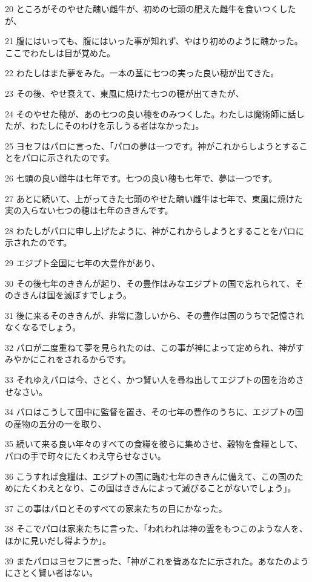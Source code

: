 \par 20 ところがそのやせた醜い雌牛が、初めの七頭の肥えた雌牛を食いつくしたが、
\par 21 腹にはいっても、腹にはいった事が知れず、やはり初めのように醜かった。ここでわたしは目が覚めた。
\par 22 わたしはまた夢をみた。一本の茎に七つの実った良い穂が出てきた。
\par 23 その後、やせ衰えて、東風に焼けた七つの穂が出てきたが、
\par 24 そのやせた穂が、あの七つの良い穂をのみつくした。わたしは魔術師に話したが、わたしにそのわけを示しうる者はなかった」。
\par 25 ヨセフはパロに言った、「パロの夢は一つです。神がこれからしようとすることをパロに示されたのです。
\par 26 七頭の良い雌牛は七年です。七つの良い穂も七年で、夢は一つです。
\par 27 あとに続いて、上がってきた七頭のやせた醜い雌牛は七年で、東風に焼けた実の入らない七つの穂は七年のききんです。
\par 28 わたしがパロに申し上げたように、神がこれからしようとすることをパロに示されたのです。
\par 29 エジプト全国に七年の大豊作があり、
\par 30 その後七年のききんが起り、その豊作はみなエジプトの国で忘れられて、そのききんは国を滅ぼすでしょう。
\par 31 後に来るそのききんが、非常に激しいから、その豊作は国のうちで記憶されなくなるでしょう。
\par 32 パロが二度重ねて夢を見られたのは、この事が神によって定められ、神がすみやかにこれをされるからです。
\par 33 それゆえパロは今、さとく、かつ賢い人を尋ね出してエジプトの国を治めさせなさい。
\par 34 パロはこうして国中に監督を置き、その七年の豊作のうちに、エジプトの国の産物の五分の一を取り、
\par 35 続いて来る良い年々のすべての食糧を彼らに集めさせ、穀物を食糧として、パロの手で町々にたくわえ守らせなさい。
\par 36 こうすれば食糧は、エジプトの国に臨む七年のききんに備えて、この国のためにたくわえとなり、この国はききんによって滅びることがないでしょう」。
\par 37 この事はパロとそのすべての家来たちの目にかなった。
\par 38 そこでパロは家来たちに言った、「われわれは神の霊をもつこのような人を、ほかに見いだし得ようか」。
\par 39 またパロはヨセフに言った、「神がこれを皆あなたに示された。あなたのようにさとく賢い者はない。
